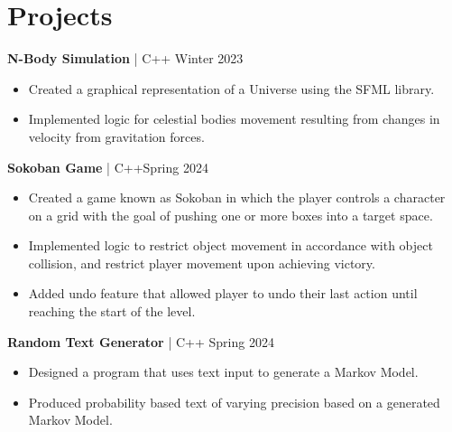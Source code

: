 \documentclass[12pt]{article}       %
\begin{document}
\section*{Projects}
\textbf{N-Body Simulation} | C++ \hfill Winter 2023 \\
\vspace{-9pt}
\begin{itemize}
  \item Created a graphical representation of a Universe using the SFML library.
  \item Implemented logic for celestial bodies movement resulting from changes in velocity from gravitation forces.
\end{itemize}

\textbf{Sokoban Game} | C++\hfill Spring 2024\\
\vspace{-9pt}
\begin{itemize}
  \item Created a game known as Sokoban in which the player controls a character on a grid with the goal of pushing one or more boxes into a target space.
  \item Implemented logic to restrict object movement in accordance with object collision, and restrict player movement upon achieving victory.
  \item Added undo feature that allowed player to undo their last action until reaching the start of the level.
\end{itemize}

\textbf{Random Text Generator} | C++ \hfill Spring 2024 \\
\vspace{-9pt}
\begin{itemize}
  \item  Designed a program that uses text input to generate a Markov Model.
  \item Produced probability based text of varying precision based on a generated Markov Model.
\end{itemize}
\end{document}
